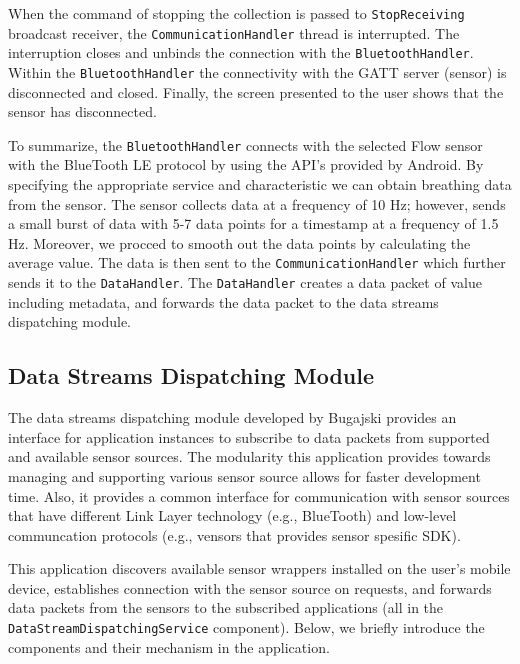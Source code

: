 When the command of stopping the collection is passed to \verb|StopReceiving| broadcast receiver, the \verb|CommunicationHandler| thread is interrupted. The interruption closes and unbinds the connection with the \verb|BluetoothHandler|. Within the \verb|BluetoothHandler| the connectivity with the GATT server (sensor) is disconnected and closed. Finally, the screen presented to the user shows that the sensor has disconnected.

To summarize, the \verb|BluetoothHandler| connects with the selected Flow sensor with the BlueTooth LE protocol by using the API's provided by Android. By specifying the appropriate service and characteristic we can obtain breathing data from the sensor. The sensor collects data at a frequency of 10 Hz; however, sends a small burst of data with 5-7 data points for a timestamp at a frequency of 1.5 Hz. Moreover, we procced to smooth out the data points by calculating the average value. The data is then sent to the \verb|CommunicationHandler| which further sends it to the \verb|DataHandler|. The \verb|DataHandler| creates a data packet of value including metadata, and forwards the data packet to the data streams dispatching module.  


\subsection{Data Streams Dispatching Module}\label{imp:dsdm}
The data streams dispatching module developed by Bugajski \cite{daniel} provides an interface for application instances to subscribe to data packets from supported and available sensor sources. The modularity this application provides towards managing and supporting various sensor source allows for faster development time. Also, it provides a common interface for communication with sensor sources that have different Link Layer technology (e.g., BlueTooth) and low-level communcation protocols (e.g., vensors that provides sensor spesific SDK). 

This application discovers available sensor wrappers installed on the user's mobile device, establishes connection with the sensor source on requests, and forwards data packets from the sensors to the subscribed applications (all in the \verb|DataStreamDispatchingService| component). Below, we briefly introduce the components and their mechanism in the application.

